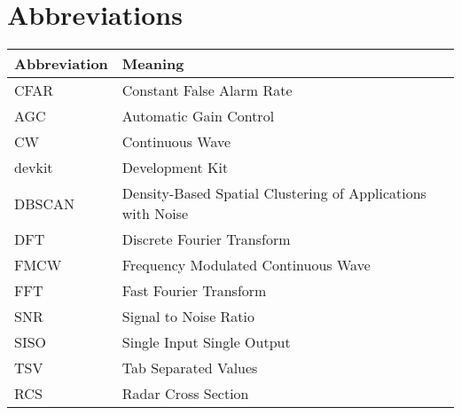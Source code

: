 
\chapter*{Abbreviations}


\begin{center}
  \begin{tabular}{| m{4cm}| m{9cm} | }
    \hline
		\textbf{Abbreviation} & \textbf{Meaning} \\
    \hline
    \hline
		CFAR & Constant False Alarm Rate \\
		AGC & Automatic Gain Control \\
		CW & Continuous Wave \\
		devkit & Development Kit \\
		DBSCAN & Density-Based Spatial Clustering of Applications with Noise \\
		DFT & Discrete Fourier Transform \\
		FMCW & Frequency Modulated Continuous Wave \\
		FFT & Fast Fourier Transform \\
		SNR & Signal to Noise Ratio \\
		SISO & Single Input Single Output \\
		TSV & Tab Separated Values \\
		RCS & Radar Cross Section \\
    \hline
  \end{tabular}

\end{center}
